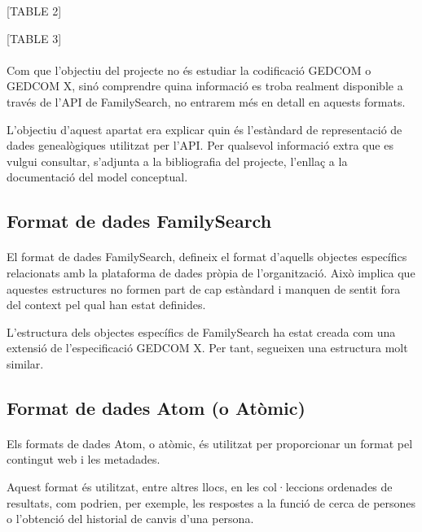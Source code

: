         [TABLE 2]

         [TABLE 3]

         \paragraph{}
         Com que l’objectiu del projecte no és estudiar la codificació GEDCOM o GEDCOM X, sinó comprendre quina informació es troba realment disponible a través de l'API de FamilySearch, no entrarem més en detall en aquests formats.

         L’objectiu d’aquest apartat era explicar quin és l'estàndard de representació de dades genealògiques utilitzat per l'API. Per qualsevol informació extra que es vulgui consultar, s’adjunta a la bibliografia del projecte, l’enllaç a la documentació del model conceptual.


     \subsection{Format de dades FamilySearch}

        \paragraph{}
        El format de dades FamilySearch, defineix el format d'aquells objectes específics relacionats amb la plataforma de dades pròpia de l'organització. Això implica que aquestes estructures no formen part de cap estàndard i manquen de sentit fora del context pel qual han estat definides.

        L'estructura dels objectes específics de FamilySearch ha estat creada com una extensió de l'especificació GEDCOM X. Per tant, segueixen una estructura molt similar.


    \subsection{Format de dades Atom (o Atòmic)}

        \paragraph{}
        Els formats de dades Atom, o atòmic, és utilitzat per proporcionar un format pel contingut web i les metadades.

        Aquest format és utilitzat, entre altres llocs, en les col·leccions ordenades de resultats, com podrien, per exemple, les respostes a la funció de cerca de persones o l'obtenció del historial de canvis d’una persona.


